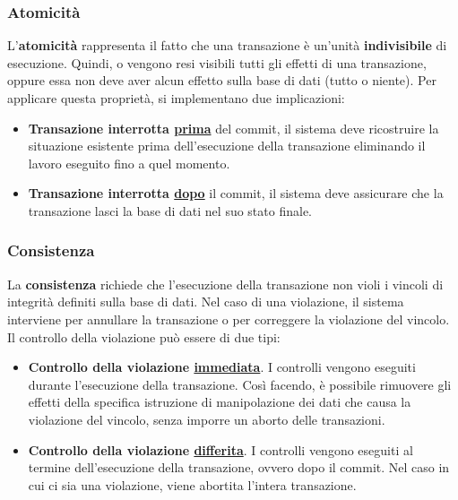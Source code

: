 \documentclass[a4paper]{article}
\begin{document}
	
	\subsubsection{Atomicità}
	
	L'\textcolor{Red3}{\textbf{atomicità}} rappresenta il fatto che una transazione è un'unità \textbf{indivisibile} di esecuzione. Quindi, o vengono resi visibili tutti gli effetti di una transazione, oppure essa non deve aver alcun effetto sulla base di dati (tutto o niente).\newline
	Per applicare questa proprietà, si implementano due implicazioni:
	\begin{itemize}
		\item \textbf{Transazione interrotta \underline{prima}} del \textsf{commit}, il sistema deve ricostruire la situazione esistente prima dell'esecuzione della transazione eliminando il lavoro eseguito fino a quel momento.
		\item \textbf{Transazione interrotta \underline{dopo}} il \textsf{commit}, il sistema deve assicurare che la transazione lasci la base di dati nel suo stato finale.
	\end{itemize}\newpage

	\subsubsection{Consistenza}
	
	La \textcolor{Red3}{\textbf{consistenza}} richiede che l'esecuzione della transazione non violi i vincoli di integrità definiti sulla base di dati. Nel caso di una violazione, il sistema interviene per annullare la transazione o per correggere la violazione del vincolo.\newline
	Il controllo della violazione può essere di due tipi:
	\begin{itemize}
		\item \textbf{Controllo della violazione \underline{immediata}}. I controlli vengono eseguiti durante l'esecuzione della transazione. Così facendo, è possibile rimuovere gli effetti della specifica istruzione di manipolazione dei dati che causa la violazione del vincolo, senza imporre un aborto delle transazioni.
		\item \textbf{Controllo della violazione \underline{differita}}. I controlli vengono eseguiti al termine dell'esecuzione della transazione, ovvero dopo il \textsf{commit}. Nel caso in cui ci sia una violazione, viene abortita l'intera transazione.
	\end{itemize}
	
\end{document}

